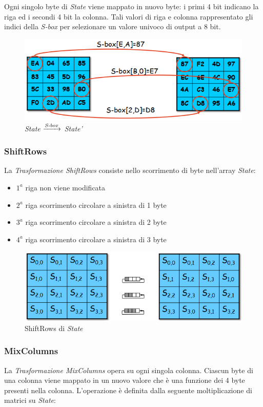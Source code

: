 \documentclass[a4paper,11pt]{article}
\begin{document}
Ogni singolo byte di \textit{State} viene mappato in nuovo byte: i primi 4 bit indicano la riga ed i secondi 4 bit la colonna. Tali valori di riga e colonna rappresentato gli indici della \textit{S-box} per selezionare un valore univoco di output a 8 bit.
\begin{figure}[h]
    \centering
    \includegraphics[scale=0.5]{subbytes}
    \caption{\textit{State} $\xrightarrow[]{\text{\textit{S-box}}}$ \textit{State'}}
\end{figure}


\subsubsection{ShiftRows}
La \textit{Trasformazione ShiftRows} consiste nello scorrimento di byte nell'array \textit{State}:
\begin{itemize}
    \item{$1^a$ riga} non viene modificata
    \item{$2^a$ riga} scorrimento circolare a sinistra di 1 byte
    \item{$3^a$ riga} scorrimento circolare a sinistra di 2 byte
    \item{$4^a$ riga} scorrimento circolare a sinistra di 3 byte
\end{itemize}

\begin{figure}[h]
    \centering
    \includegraphics[scale=0.5]{shiftrows}
    \caption{ShiftRows di \textit{State}}
\end{figure}
\subsubsection{MixColumns}
La \textit{Trasformazione MixColumns} opera su ogni singola colonna. Ciascun byte di una colonna viene mappato in un nuovo valore che è una funzione dei 4 byte presenti nella colonna.
L'operazione è definita dalla seguente moltiplicazione di matrici su \textit{State}:
\end{document}
